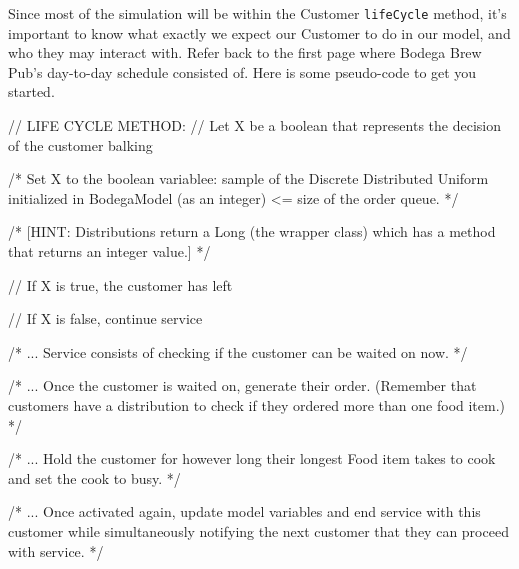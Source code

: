 \documentclass[11pt]{article}
\newcommand{\method}[1]{\texttt{#1}}
\begin{document}
\newline
Since most of the simulation will be within the Customer \method{lifeCycle} method, it's important to know what exactly we expect our Customer to do in our model, and who they may interact with. Refer back to the first page where Bodega Brew Pub's day-to-day schedule consisted of.
Here is some pseudo-code to get you started.
\begin{java}
// LIFE CYCLE METHOD:
	// Let X be a boolean that represents the decision of the customer balking

	/*
	Set X to the boolean variablee: sample of the Discrete Distributed  Uniform initialized in BodegaModel (as an integer) <= size of the order queue.
	*/

	/*
	[HINT: Distributions return a Long (the wrapper class) which has a method that returns an integer value.]
	*/

	// If X is true, the customer has left

	// If X is false, continue service

	/*
	... Service consists of checking if the customer can be waited on now.
	*/

	/*
	... Once the customer is waited on, generate their order. (Remember that customers have a distribution to check if they ordered more than one food item.)
	*/

	/*
	... Hold the customer for however long their longest Food item takes to cook and set the cook to busy.
	*/

	/*
	... Once activated again, update model variables and end service with this customer while simultaneously notifying the next customer that they can proceed with service.
	*/
\end{java}
\pagebreak
\end{document}
